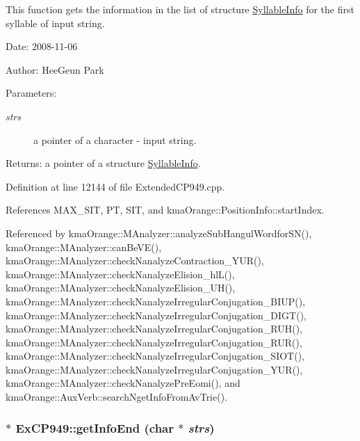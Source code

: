 This function gets the information in the list of structure \hyperlink{structkmaOrange_1_1SyllableInfo}{SyllableInfo} for the first syllable of input string. 

\begin{Desc}
\item[Date:]2008-11-06 \end{Desc}
\begin{Desc}
\item[Author:]HeeGeun Park \end{Desc}
\begin{Desc}
\item[Parameters:]
\begin{description}
\item[{\em strs}]a pointer of a character - input string. \end{description}
\end{Desc}
\begin{Desc}
\item[Returns:]a pointer of a structure \hyperlink{structkmaOrange_1_1SyllableInfo}{SyllableInfo}. \end{Desc}


Definition at line 12144 of file ExtendedCP949.cpp.

References MAX\_\-SIT, PT, SIT, and kmaOrange::PositionInfo::startIndex.

Referenced by kmaOrange::MAnalyzer::analyzeSubHangulWordforSN(), kmaOrange::MAnalyzer::canBeVE(), kmaOrange::MAnalyzer::checkNanalyzeContraction\_\-YUR(), kmaOrange::MAnalyzer::checkNanalyzeElision\_\-hlL(), kmaOrange::MAnalyzer::checkNanalyzeElision\_\-UH(), kmaOrange::MAnalyzer::checkNanalyzeIrregularConjugation\_\-BIUP(), kmaOrange::MAnalyzer::checkNanalyzeIrregularConjugation\_\-DIGT(), kmaOrange::MAnalyzer::checkNanalyzeIrregularConjugation\_\-RUH(), kmaOrange::MAnalyzer::checkNanalyzeIrregularConjugation\_\-RUR(), kmaOrange::MAnalyzer::checkNanalyzeIrregularConjugation\_\-SIOT(), kmaOrange::MAnalyzer::checkNanalyzeIrregularConjugation\_\-YUR(), kmaOrange::MAnalyzer::checkNanalyzePreEomi(), and kmaOrange::AuxVerb::searchNgetInfoFromAvTrie().\hypertarget{classkmaOrange_1_1ExCP949_bec82a4143b93be47cadd1ce7e259c2c}{
\subsubsection[{getInfoEnd}]{ $\ast$ ExCP949::getInfoEnd (char $\ast$ {\em strs})}}
\label{classkmaOrange_1_1ExCP949_bec82a4143b93be47cadd1ce7e259c2c}


